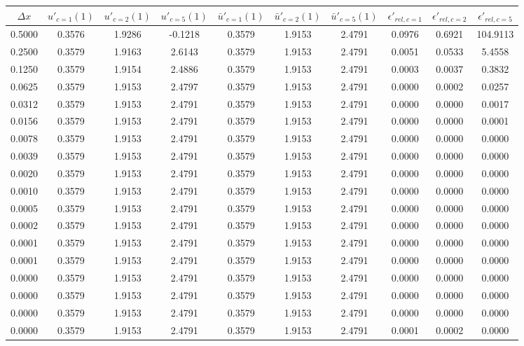 \begin{tabular}{|c|c|c|c|c|c|c|c|c|c|}
\hline
\textbf{$\Delta x$}&\textbf{$u'_{c=1}(1)$}&\textbf{$u'_{c=2}(1)$}&\textbf{$u'_{c=5}(1)$}&\textbf{$\bar{u}'_{c=1}(1)$}&\textbf{$\bar{u}'_{c=2}(1)$}&\textbf{$\bar{u}'_{c=5}(1)$}&\textbf{$\epsilon'_{rel,c=1}$}&\textbf{$\epsilon'_{rel,c=2}$}&\textbf{$\epsilon'_{rel,c=5}$}\\\hline
0.5000&0.3576&1.9286&-0.1218&0.3579&1.9153&2.4791&0.0976&0.6921&104.9113\\\hline
0.2500&0.3579&1.9163&2.6143&0.3579&1.9153&2.4791&0.0051&0.0533&5.4558\\\hline
0.1250&0.3579&1.9154&2.4886&0.3579&1.9153&2.4791&0.0003&0.0037&0.3832\\\hline
0.0625&0.3579&1.9153&2.4797&0.3579&1.9153&2.4791&0.0000&0.0002&0.0257\\\hline
0.0312&0.3579&1.9153&2.4791&0.3579&1.9153&2.4791&0.0000&0.0000&0.0017\\\hline
0.0156&0.3579&1.9153&2.4791&0.3579&1.9153&2.4791&0.0000&0.0000&0.0001\\\hline
0.0078&0.3579&1.9153&2.4791&0.3579&1.9153&2.4791&0.0000&0.0000&0.0000\\\hline
0.0039&0.3579&1.9153&2.4791&0.3579&1.9153&2.4791&0.0000&0.0000&0.0000\\\hline
0.0020&0.3579&1.9153&2.4791&0.3579&1.9153&2.4791&0.0000&0.0000&0.0000\\\hline
0.0010&0.3579&1.9153&2.4791&0.3579&1.9153&2.4791&0.0000&0.0000&0.0000\\\hline
0.0005&0.3579&1.9153&2.4791&0.3579&1.9153&2.4791&0.0000&0.0000&0.0000\\\hline
0.0002&0.3579&1.9153&2.4791&0.3579&1.9153&2.4791&0.0000&0.0000&0.0000\\\hline
0.0001&0.3579&1.9153&2.4791&0.3579&1.9153&2.4791&0.0000&0.0000&0.0000\\\hline
0.0001&0.3579&1.9153&2.4791&0.3579&1.9153&2.4791&0.0000&0.0000&0.0000\\\hline
0.0000&0.3579&1.9153&2.4791&0.3579&1.9153&2.4791&0.0000&0.0000&0.0000\\\hline
0.0000&0.3579&1.9153&2.4791&0.3579&1.9153&2.4791&0.0000&0.0000&0.0000\\\hline
0.0000&0.3579&1.9153&2.4791&0.3579&1.9153&2.4791&0.0000&0.0000&0.0000\\\hline
0.0000&0.3579&1.9153&2.4791&0.3579&1.9153&2.4791&0.0001&0.0002&0.0000\\\hline
\end{tabular}
